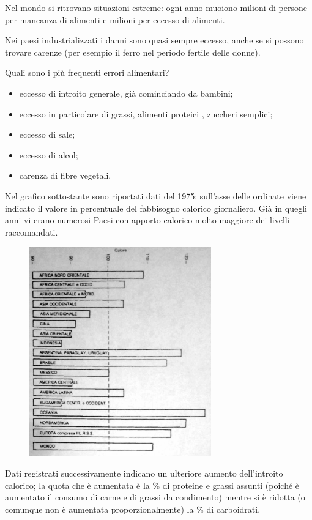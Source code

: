 Nel mondo si ritrovano situazioni estreme: ogni anno muoiono milioni di
persone per mancanza di alimenti e milioni per eccesso di alimenti.

Nei paesi industrializzati i danni sono quasi sempre eccesso, anche se
si possono trovare carenze (per esempio il ferro nel periodo fertile
delle donne).

Quali sono i più frequenti errori alimentari?

\begin{itemize}
\item
  eccesso di introito generale, già cominciando da bambini;
\item
  eccesso in particolare di grassi, alimenti proteici , zuccheri
  semplici;
\item
  eccesso di sale;
\item
  eccesso di alcol;
\item
  carenza di fibre vegetali.
\end{itemize}

Nel grafico sottostante sono riportati dati del 1975; sull'asse delle
ordinate viene indicato il valore in percentuale del fabbisogno calorico
giornaliero. Già in quegli anni vi erano numerosi Paesi con apporto
calorico molto maggiore dei livelli raccomandati.

\begin{figure}[!ht]
\centering
	\includegraphics[width=0.7\textwidth]{20/image10.jpeg}
	\end{figure}

Dati registrati successivamente indicano un ulteriore aumento
dell'introito calorico; la quota che è aumentata è la \% di proteine e
grassi assunti (poiché è aumentato il consumo di carne e di grassi da
condimento) mentre si è ridotta (o comunque non è aumentata
proporzionalmente) la \% di carboidrati.

